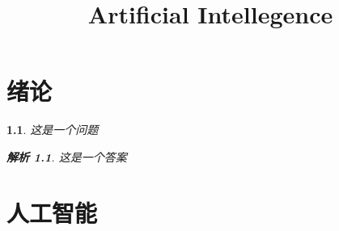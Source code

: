 \documentclass{book}
\title{Artificial Intellegence}
\date{}
\newtheorem{problem}{}[chapter]
\newtheorem{answer}{解析}
\begin{document}
\maketitle

\chapter{绪论}

\begin{problem}
这是一个问题
\begin{answer}
这是一个答案
\end{answer}
\end{problem}

\chapter{人工智能}
\end{document}
